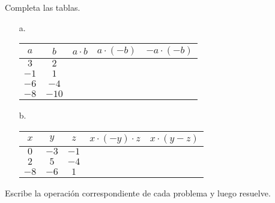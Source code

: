 \documentclass[spanish,letterpaper, 11pt, addpoints, answers]{exam}
\begin{document}
\begin{questions}
\question Completa las tablas.

\begin{itemize}
  \item[a.]
\begin{center}
  \begin{tabular}{|c|c|>{\centering\arraybackslash}p{2.5cm}|>{\centering\arraybackslash}p{2.5cm}|>{\centering\arraybackslash}p{2.5cm}|}\hline
    $a$ & $b$ & $a\cdot b$ & $a\cdot (-b)$ & $-a\cdot (-b)$ \\ \hline
    $3$ & $2$ &&& \\ \hline
    $-1$ & $1$ &&& \\ \hline
    $-6$ & $-4$ &&& \\ \hline
    $-8$ & $-10$ &&& \\ \hline
  \end{tabular}
\end{center}
\vspace{0.5cm}
\item[b.]
\begin{center}
  \begin{tabular}{|c|c|c|>{\centering\arraybackslash}p{3.5cm}|>{\centering\arraybackslash}p{3.5cm}|}\hline
  $x$&$y$&$z$&$x\cdot (-y)\cdot z$&$x\cdot (y-z)$\\ \hline
  $0$&$-3$&$-1$&&\\ \hline
  $2$&$5$&$-4$&&\\ \hline
  $-8$&$-6$&$1$&&\\ \hline
  
    
  \end{tabular}
\end{center}
\end{itemize}

\question Escribe la operación correspondiente de cada problema y luego resuelve.


\end{questions}
\end{document}
